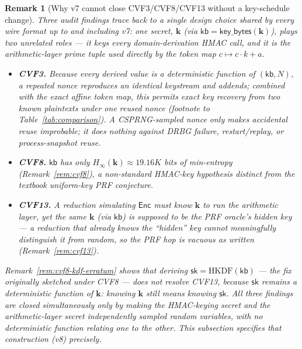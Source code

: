 \documentclass[11pt,a4paper]{article}
\newtheorem{remark}[theorem]{Remark}
\begin{document}
\begin{remark}[Why v7 cannot close CVF3/CVF8/CVF13 without a key-schedule change]
\label{rem:v8-motivation}
Three audit findings trace back to a single design choice shared by every
wire format up to and including v7: \emph{one} secret, $\mathbf{k}$ (via
$\mathsf{kb}=\mathsf{key\_bytes}(\mathbf{k})$), plays two unrelated roles
--- it keys every domain-derivation HMAC call, \emph{and} it is the
arithmetic-layer prime tuple used directly by the token map $c\mapsto
c\cdot k+a$.
\begin{itemize}
  \item \textbf{CVF3.} Because every derived value is a deterministic
        function of $(\mathsf{kb}, N)$, a repeated nonce reproduces an
        identical keystream and addends; combined with the exact affine
        token map, this permits exact key recovery from two known
        plaintexts under one reused nonce (footnote to
        Table~\ref{tab:comparison}). A CSPRNG-sampled nonce only makes
        \emph{accidental} reuse improbable; it does nothing against DRBG
        failure, restart/replay, or process-snapshot reuse.
  \item \textbf{CVF8.} $\mathsf{kb}$ has only $H_\infty(\mathbf{k})\approx
        19.16K$ bits of min-entropy (Remark~\ref{rem:cvf8}), a non-standard
        HMAC-key hypothesis distinct from the textbook uniform-key PRF
        conjecture.
  \item \textbf{CVF13.} A reduction simulating $\mathsf{Enc}$ must know
        $\mathbf{k}$ to run the arithmetic layer, yet the same $\mathbf{k}$
        (via $\mathsf{kb}$) is supposed to be the PRF oracle's hidden key
        --- a reduction that already knows the ``hidden'' key cannot
        meaningfully distinguish it from random, so the PRF hop is vacuous
        as written (Remark~\ref{rem:cvf13}).
\end{itemize}
Remark~\ref{rem:cvf8-kdf-erratum} shows that deriving
$\mathsf{sk}=\mathrm{HKDF}(\mathsf{kb})$ --- the fix originally sketched
under CVF8 --- does \emph{not} resolve CVF13, because $\mathsf{sk}$ remains
a deterministic function of $\mathbf{k}$: knowing $\mathbf{k}$ still means
knowing $\mathsf{sk}$. All three findings are closed simultaneously only by
making the HMAC-keying secret and the arithmetic-layer secret
\emph{independently sampled} random variables, with no deterministic
function relating one to the other. This subsection specifies that
construction (v8) precisely.
\end{remark}
\end{document}
